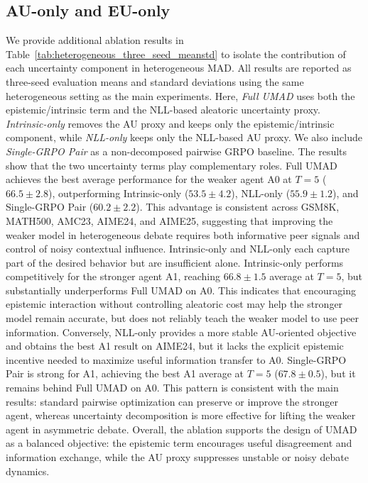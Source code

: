 \documentclass{article}
\theoremstyle{plain}
\theoremstyle{definition}
\theoremstyle{remark}
\begin{document}
\subsection{AU-only and EU-only}\label{app:supply_au_eu}
We provide additional ablation results in Table~\ref{tab:heterogeneous_three_seed_meanstd} to isolate the contribution of each uncertainty component in heterogeneous MAD. All results are reported as three-seed evaluation means and standard deviations using the same heterogeneous setting as the main experiments. Here, \textit{Full UMAD} uses both the epistemic/intrinsic term and the NLL-based aleatoric uncertainty proxy. \textit{Intrinsic-only} removes the AU proxy and keeps only the epistemic/intrinsic component, while \textit{NLL-only} keeps only the NLL-based AU proxy. We also include \textit{Single-GRPO Pair} as a non-decomposed pairwise GRPO baseline.
The results show that the two uncertainty terms play complementary roles. Full UMAD achieves the best average performance for the weaker agent A0 at $T=5$ ($66.5{\pm}2.8$), outperforming Intrinsic-only ($53.5{\pm}4.2$), NLL-only ($55.9{\pm}1.2$), and Single-GRPO Pair ($60.2{\pm}2.2$). This advantage is consistent across GSM8K, MATH500, AMC23, AIME24, and AIME25, suggesting that improving the weaker model in heterogeneous debate requires both informative peer signals and control of noisy contextual influence.
Intrinsic-only and NLL-only each capture part of the desired behavior but are insufficient alone. Intrinsic-only performs competitively for the stronger agent A1, reaching $66.8{\pm}1.5$ average at $T=5$, but substantially underperforms Full UMAD on A0. This indicates that encouraging epistemic interaction without controlling aleatoric cost may help the stronger model remain accurate, but does not reliably teach the weaker model to use peer information. Conversely, NLL-only provides a more stable AU-oriented objective and obtains the best A1 result on AIME24, but it lacks the explicit epistemic incentive needed to maximize useful information transfer to A0.
Single-GRPO Pair is strong for A1, achieving the best A1 average at $T=5$ ($67.8{\pm}0.5$), but it remains behind Full UMAD on A0. This pattern is consistent with the main results: standard pairwise optimization can preserve or improve the stronger agent, whereas uncertainty decomposition is more effective for lifting the weaker agent in asymmetric debate. Overall, the ablation supports the design of UMAD as a balanced objective: the epistemic term encourages useful disagreement and information exchange, while the AU proxy suppresses unstable or noisy debate dynamics.
\end{document}
